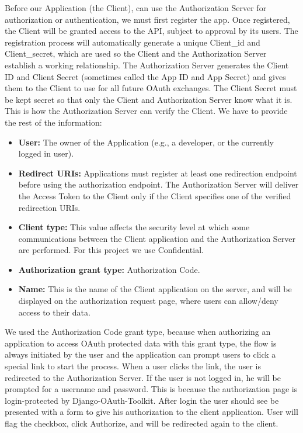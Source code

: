 Before our Application (the Client), can use the Authorization Server for authorization or authentication, we must first register the app. Once registered, the Client will be granted access to the API, subject to approval by its users. The registration process will automatically generate a unique Client\_id and Client\_secret, which are used so the Client and the Authorization Server establish a working relationship. The Authorization Server generates the Client ID and Client Secret (sometimes called the App ID and App Secret) and gives them to the Client to use for all future OAuth exchanges. The Client Secret must be kept secret so that only the Client and Authorization Server know what it is. This is how the Authorization Server can verify the Client. We have to provide the rest of the information:

\begin{itemize}

	\item \textbf{User:} The owner of the Application (e.g., a developer, or the currently logged in user).

	\item \textbf{Redirect URIs:} Applications must register at least one redirection endpoint before using the authorization endpoint. The Authorization Server will deliver the Access Token to the Client only if the Client specifies one of the verified redirection URIs.

	\item \textbf{Client type:} This value affects the security level at which some communications between the Client application and the Authorization Server are performed. For this project we use Confidential.

	\item \textbf{Authorization grant type:} Authorization Code.

	\item \textbf{Name:} This is the name of the Client application on the server, and will be displayed on the authorization request page, where users can allow/deny access to their data.

\end{itemize}

We used the Authorization Code grant type, because when authorizing an application to access OAuth protected data with this grant type, the flow is always initiated by the user and the application can prompt users to click a special link to start the process. When a user clicks the link, the user is redirected to the Authorization Server. If the user is not logged in, he will be prompted for a username and password. This is because the authorization page is login-protected by Django-OAuth-Toolkit. After login the user should see be presented with a form to give his authorization to the client application. User will flag the checkbox, click Authorize, and will be redirected again to the client.

